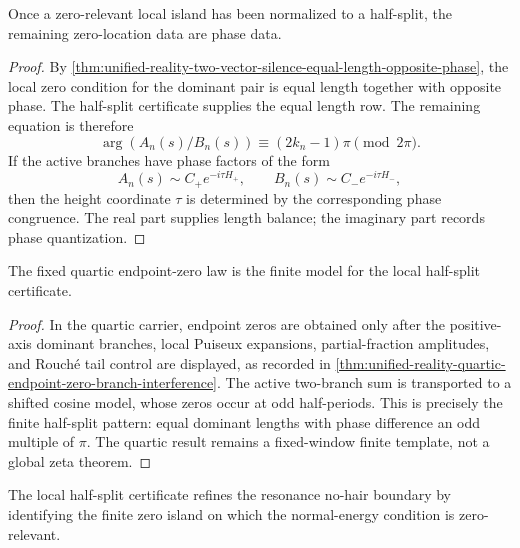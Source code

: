 \begin{corollary}
\label{cor:unified-reality-phase-carries-remaining-zero-data}
Once a zero-relevant local island has been normalized to a half-split,
the remaining zero-location data are phase data.
\end{corollary}

\begin{proof}
By
\autoref{thm:unified-reality-two-vector-silence-equal-length-opposite-phase},
the local zero condition for the dominant pair is equal length together
with opposite phase.  The half-split certificate supplies the equal
length row.  The remaining equation is therefore
$$
\arg(A_n(s)/B_n(s))\equiv(2k_n-1)\pi
\pmod{2\pi}.
$$
If the active branches have phase factors of the form
$$
A_n(s)\sim C_+e^{-i\tau H_+},
\qquad
B_n(s)\sim C_-e^{-i\tau H_-},
$$
then the height coordinate $\tau$ is determined by the corresponding
phase congruence.  The real part supplies length balance; the imaginary
part records phase quantization.
\end{proof}

\begin{corollary}
\label{cor:unified-reality-quartic-endpoint-half-split-template}
The fixed quartic endpoint-zero law is the finite model for the local
half-split certificate.
\end{corollary}

\begin{proof}
In the quartic carrier, endpoint zeros are obtained only after the
positive-axis dominant branches, local Puiseux expansions,
partial-fraction amplitudes, and Rouch\'e tail control are displayed, as
recorded in
\autoref{thm:unified-reality-quartic-endpoint-zero-branch-interference}.
The active two-branch sum is transported to a shifted cosine model, whose
zeros occur at odd half-periods.  This is precisely the finite
half-split pattern: equal dominant lengths with phase difference an odd
multiple of $\pi$.  The quartic result remains a fixed-window finite
template, not a global zeta theorem.
\end{proof}

\begin{corollary}
\label{cor:unified-reality-local-half-split-refines-resonance-no-hair}
The local half-split certificate refines the resonance no-hair boundary
by identifying the finite zero island on which the normal-energy
condition is zero-relevant.
\end{corollary}

